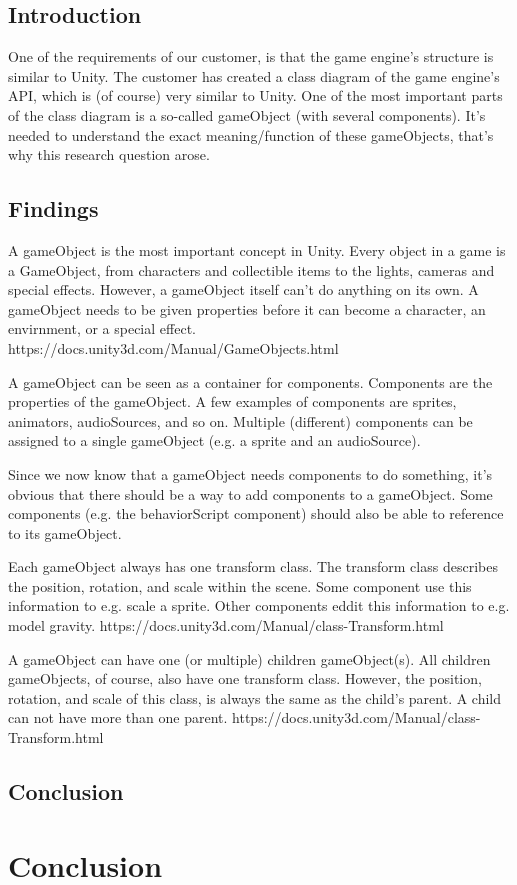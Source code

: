 \documentclass{projdoc}
\begin{document}
\subsection{Introduction}
One of the requirements of our customer, is that the game engine's structure is similar to Unity. The customer has created a class diagram of the game engine's API, which is (of course) very similar to Unity. One of the most important parts of the class diagram is a so-called gameObject (with several components). It's needed to understand the exact meaning/function of these gameObjects, that's why this research question arose.
\subsection{Findings}
A gameObject is the most important concept in Unity. Every object in a game is a GameObject, from characters and collectible items to the lights, cameras and special effects. However, a gameObject itself can't do anything on its own. A gameObject needs to be given properties before it can become a character, an envirnment, or a special effect. https://docs.unity3d.com/Manual/GameObjects.html

A gameObject can be seen as a container for components. Components are the properties of the gameObject. A few examples of components are sprites, animators, audioSources, and so on. Multiple (different) components can be assigned to a single gameObject (e.g. a sprite and an audioSource).

Since we now know that a gameObject needs components to do something, it's obvious that there should be a way to add components to a gameObject. Some components (e.g. the behaviorScript component) should also be able to reference to its gameObject.

Each gameObject always has one transform class. The transform class describes the position, rotation, and scale within the scene. Some component use this information to e.g. scale a sprite. Other components eddit this information to e.g. model gravity. https://docs.unity3d.com/Manual/class-Transform.html

A gameObject can have one (or multiple) children gameObject(s). All children gameObjects, of course, also have one transform class. However, the position, rotation, and scale of this class, is always the same as the child's parent. A child can not have more than one parent. https://docs.unity3d.com/Manual/class-Transform.html
\subsection{Conclusion}

\section{Conclusion}
\end{document}
